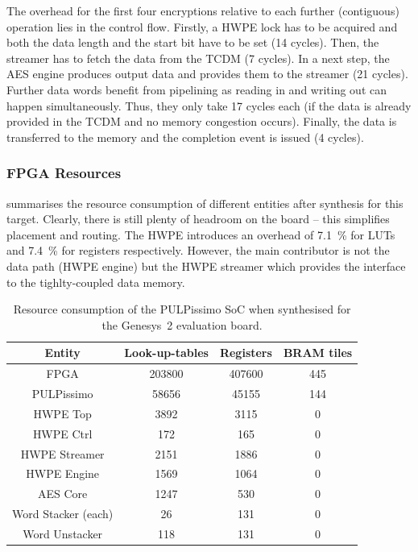 \documentclass[a4paper, 12pt]{article}
\begin{document}
The overhead for the first four encryptions relative to each further (contiguous) operation lies in the control flow. Firstly, a HWPE lock has to be acquired and both the data length and the start bit have to be set (14 cycles). Then, the streamer has to fetch the data from the TCDM (7 cycles). In a next step, the AES engine produces output data and provides them to the streamer (21 cycles). Further data words benefit from pipelining as reading in and writing out can happen simultaneously. Thus, they only take 17 cycles each (if the data is already provided in the TCDM and no memory congestion occurs). Finally, the data is transferred to the memory and the completion event is issued (4 cycles). 

\subsubsection{FPGA Resources}

 summarises the resource consumption of different entities after synthesis for this target. Clearly, there is still plenty of headroom on the board -- this simplifies placement and routing. The HWPE introduces an overhead of \SI{7.1}{\percent} for LUTs and \SI{7.4}{\percent} for registers respectively. However, the main contributor is not the data path (HWPE engine) but the HWPE streamer which provides the interface to the tighlty-coupled data memory.

\begin{table}[h]
    \centering
    \begin{tabular}{c|c c c}
        \toprule
        Entity &  Look-up-tables & Registers & BRAM tiles \\
        \midrule
		FPGA &  203800 &  407600 &  445 \\
		PULPissimo & 58656 & 45155 & 144 \\ 
		HWPE Top & 3892 & 3115 & 0 \\ 
		HWPE Ctrl & 172 & 165 & 0 \\ 
		HWPE Streamer & 2151 & 1886 & 0 \\ 
		HWPE Engine & 1569 & 1064 & 0 \\ 
		AES Core & 1247 & 530 & 0 \\ 
		Word Stacker (each) & 26 & 131 & 0 \\ 
		Word Unstacker & 118 & 131 & 0 \\
        \bottomrule
    \end{tabular}
	\caption{Resource consumption of the PULPissimo SoC when synthesised for the Genesys~2 evaluation board.}
	\label{tab:results-genesys}
\end{table}
\end{document}
